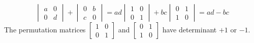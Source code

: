 \begin{example}
\[
\begin{vmatrix}
a&0\\0&d
\end{vmatrix}+\begin{vmatrix}
0&b\\c&0
\end{vmatrix}=ad\begin{vmatrix}
1&0\\0&1
\end{vmatrix}+bc\begin{vmatrix}
0&1\\1&0
\end{vmatrix}=ad-bc
\]
The permutation matrices $\begin{bmatrix}
1&0\\0&1
\end{bmatrix}$ and $\begin{bmatrix}
0&1\\1&0
\end{bmatrix}$ have determinant $+1$ or $-1$.
\end{example}

